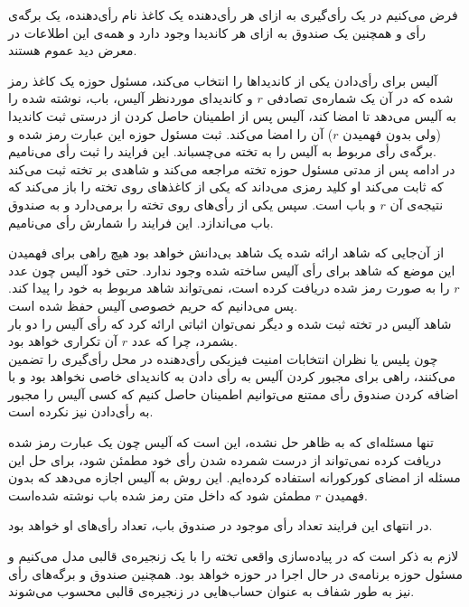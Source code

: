 \par
فرض می‌کنیم در یک رأی‌گیری به ازای هر رأی‌دهنده یک کاغذ نام رأی‌دهنده، یک برگه‌ی رأی و همچنین یک صندوق به ازای هر کاندیدا وجود دارد و همه‌ی این اطلاعات در معرض دید عموم هستند. 
\par
آلیس برای رأی‌دادن یکی از کاندیداها را انتخاب می‌کند، مسئول حوزه یک کاغذ رمز شده که در آن یک شماره‌ی تصادفی $r$ و کاندیدای موردنظر آلیس، باب، نوشته شده را به آلیس می‌دهد تا امضا کند، آلیس پس از اطمینان حاصل کردن از درستی ثبت کاندیدا (ولی بدون فهمیدن $r$) آن را امضا می‌کند. ثبت مسئول حوزه این عبارت رمز شده و برگه‌ی رأی مربوط به آلیس را به تخته می‌چسباند. این فرایند را ثبت رأی‌ می‌نامیم.
\\
در ادامه پس از مدتی مسئول حوزه تخته مراجعه‌ می‌کند و شاهدی بر تخته ثبت می‌کند که ثابت می‌کند او کلید رمزی می‌داند که یکی از کاغذ‌های روی تخته را باز می‌کند که نتیجه‌ی آن $r$ و باب است. سپس یکی از رأی‌های روی تخته را برمی‌دارد و به صندوق باب می‌اندازد. این فرایند را شمارش رأی‌ می‌نامیم.
\par
از آن‌جایی که شاهد ارائه شده یک شاهد بی‌دانش خواهد بود هیچ راهی برای فهمیدن این موضع که شاهد برای رأی آلیس ساخته شده وجود ندارد. حتی خود آلیس چون عدد $r$ را به صورت رمز شده دریافت کرده است، نمی‌تواند شاهد مربوط به خود را پیدا کند. پس می‌دانیم که حریم خصوصی آلیس حفظ شده است. 
\\
 شاهد آلیس در تخته ثبت شده و دیگر نمی‌توان اثباتی ارائه کرد که رأی آلیس را دو بار بشمرد، چرا که عدد $r$ آن تکراری خواهد بود.
\\
چون پلیس یا نظران انتخابات امنیت فیزیکی رأی‌دهنده در محل رأی‌گیری را تضمین می‌کنند، راهی برای مجبور کردن آلیس به رأی دادن به کاندیدای خاصی نخواهد بود و با اضافه کردن صندوق رأی ممتنع می‌توانیم اطمینان حاصل کنیم که کسی آلیس را مجبور به رأی‌دادن نیز نکرده است. 
\par 
تنها مسئله‌ای که به ظاهر حل نشده، این است که آلیس چون یک عبارت رمز شده دریافت کرده نمی‌تواند از درست شمرده شدن رأی خود مطمئن شود، برای حل این مسئله از امضای کورکورانه استفاده کرده‌ایم. این روش به آلیس اجازه می‌دهد که بدون فهمیدن $r$ مطمئن شود که داخل متن رمز شده باب نوشته شده‌است. 
\par 
در انتهای این فرایند تعداد رأی‌ موجود در صندوق باب، تعداد رأی‌های او خواهد بود.
\par 
لازم به ذکر است که در پیاده‌سازی واقعی تخته را با یک زنجیره‌ی قالبی مدل می‌کنیم و مسئول حوزه برنامه‌ی در حال اجرا در حوزه‌ خواهد بود. همچنین صندوق و برگه‌ها‌ی رأی نیز به طور شفاف به عنوان حساب‌هایی در زنجیره‌ی قالبی  محسوب می‌شوند. 


